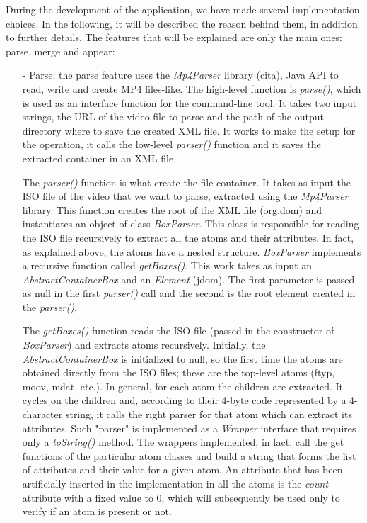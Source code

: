 During the development of the application, we have made several implementation choices. In the following, it will be described the reason behind them, in addition to further details. The features that will be explained are only the main ones: parse, merge and appear:

\begin{itemize}

\item[-] Parse: the parse feature uses the \emph{Mp4Parser} library (cita), Java API to read, write and create MP4 files-like.
The high-level function is \emph{parse()}, which is used as an interface function for the command-line tool. It takes two input strings, the URL of the video file to parse and the path of the output directory where to save the created XML file. It works to make the setup for the operation, it calls the low-level \emph{parser()} function and it saves the extracted container in an XML file.

The \emph{parser()} function is what create the file container. It takes as input the ISO file of the video that we want to parse, extracted using the \emph{Mp4Parser} library. This function creates the root of the XML file (org.dom) and instantiates an object of class \emph{BoxParser}. This class is responsible for reading the ISO file recursively to extract all the atoms and their attributes. In fact, as explained above, the atoms have a nested structure. \emph{BoxParser} implements a recursive function called \emph{getBoxes()}. This work takes as input an \emph{AbstractContainerBox} and an \emph{Element} (jdom). The first parameter is passed as null in the first \emph{parser()} call and the second is the root element created in the \emph{parser()}.

The \emph{getBoxes()} function reads the ISO file (passed in the constructor of \emph{BoxParser}) and extracts atoms recursively. Initially, the \emph{AbstractContainerBox} is initialized to null, so the first time the atoms are obtained directly from the ISO files; these are the top-level atoms (ftyp, moov, mdat, etc.). In general, for each atom the children are extracted. It cycles on the children and, according to their 4-byte code represented by a 4-character string, it calls the right parser for that atom which can extract its attributes. Such "parser" is implemented as a \emph{Wrapper} interface that requires only a \emph{toString()} method. The wrappers implemented, in fact, call the get functions of the particular atom classes and build a string that forms the list of attributes and their value for a given atom. An attribute that has been artificially inserted in the implementation in all the atoms is the \emph{count} attribute with a fixed value to 0, which will subsequently be used only to verify if an atom is present or not. 
 

\end{itemize}
